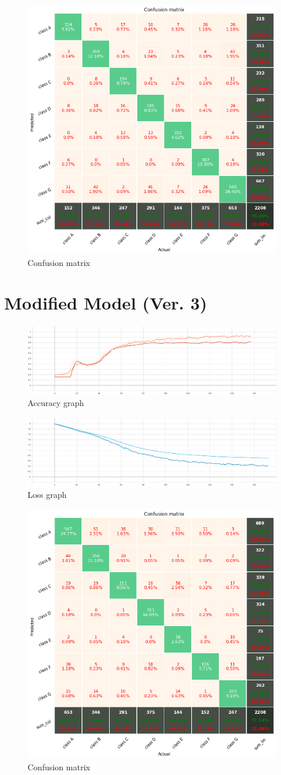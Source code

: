 \begin{figure}[htbp]
\centering
\includegraphics[width=0.6\linewidth]{evaluation/fig/confusion2.png}
\caption{Confusion matrix}
\label{fig:confusion2}
\end{figure}

\newpage
\section{Modified Model (Ver. 3)}

\begin{figure}[htbp]
\centering
\includegraphics[width=0.7\linewidth]{evaluation/fig/Accuracy3.png}
\caption{Accuracy graph}
\label{fig:accuracy3}
\end{figure}

\begin{figure}[htbp]
\centering
\includegraphics[width=0.7\linewidth]{evaluation/fig/Loss3.png}
\caption{Loss graph}
\label{fig:evaluation3}
\end{figure}

\begin{figure}[htbp]
\centering
\includegraphics[width=0.6\linewidth]{evaluation/fig/confusion3.png}
\caption{Confusion matrix}
\label{fig:confusion3}
\end{figure}
